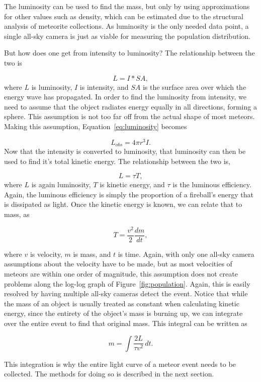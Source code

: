 The luminosity can be used to find the mass, but only by using approximations for other values such as density, which can be estimated due to the structural analysis of meteorite collections. As luminosity is the only needed data point, a single all-sky camera is just as viable for measuring the population distribution.

But how does one get from intensity to luminosity? The relationship between the two is

\begin{equation}
	L = I * SA,
	\label{eq:luminosity}
\end{equation}
where $L$ is luminosity, $I$ is intensity, and $SA$ is the surface area over which the energy wave has propagated. In order to find the luminosity from intensity, we need to assume that the object radiates energy equally in all directions, forming a sphere. This assumption is not too far off from the actual shape of most meteors. Making this assumption, Equation~\ref{eq:luminosity} becomes 

\begin{equation}
	L_{obs} = 4 \pi r^3 I.
\end{equation}
Now that the intensity is converted to luminosity, that luminosity can then be used to find it's total kinetic energy. The relationship between the two is,

\begin{equation}
	L = \tau T,
	\label{eq:kinetic}
\end{equation}
where $L$ is again luminosity, $T$ is kinetic energy, and $\tau$ is the luminous efficiency. Again, the luminous efficiency is simply the proportion of a fireball's energy that is dissipated as light. Once the kinetic energy is known, we can relate that to mass, as

\begin{equation}
	T = \frac{v^2}{2}\frac{dm}{dt},
\end{equation}

where $v$ is velocity, $m$ is mass, and $t$ is time. Again, with only one all-sky camera assumptions about the velocity have to be made, but as most velocities of meteors are within one order of magnitude, this assumption does not create problems along the log-log graph of Figure~\ref{fig:population}. Again, this is easily resolved by having multiple all-sky cameras detect the event. Notice that while the mass of an object is usually treated as constant when calculating kinetic energy, since the entirety of the object's mass is burning up, we can integrate over the entire event to find that original mass. This integral can be written as

\begin{equation}
m =\int \frac{2L}{\tau v^2}\,dt.
\end{equation}

This integration is why the entire light curve of a meteor event needs to be collected. The methods for doing so is described in the next section.
